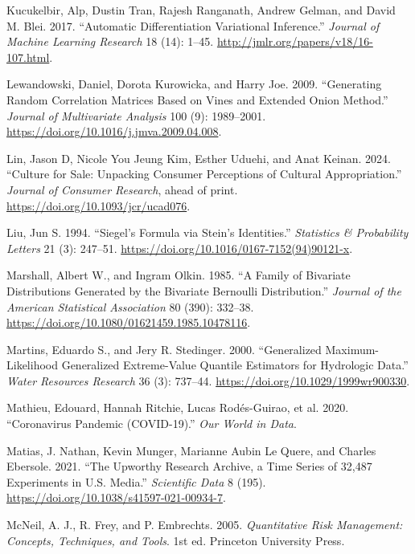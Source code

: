 \documentclass[
  11pt,
  letterpaper,
]{scrbook}
\newlength{\cslhangindent}
\newenvironment{CSLReferences}[2] %
 {\begin{list}{}{%
  \setlength{\itemindent}{0pt}
  \setlength{\leftmargin}{0pt}
  \setlength{\parsep}{0pt}
  \ifodd #1
   \setlength{\leftmargin}{\cslhangindent}
   \setlength{\itemindent}{-1\cslhangindent}
  \fi
  \setlength{\itemsep}{#2\baselineskip}}}
 {\end{list}}
\theoremstyle{definition}
\theoremstyle{plain}
\theoremstyle{plain}
\theoremstyle{plain}
\theoremstyle{definition}
\theoremstyle{definition}
\theoremstyle{plain}
\theoremstyle{plain}
\theoremstyle{remark}
\begin{document}
\begin{CSLReferences}{1}{1}
Kucukelbir, Alp, Dustin Tran, Rajesh Ranganath, Andrew Gelman, and David
M. Blei. 2017. {``Automatic Differentiation Variational Inference.''}
\emph{Journal of Machine Learning Research} 18 (14): 1--45.
\url{http://jmlr.org/papers/v18/16-107.html}.

Lewandowski, Daniel, Dorota Kurowicka, and Harry Joe. 2009.
{``Generating Random Correlation Matrices Based on Vines and Extended
Onion Method.''} \emph{Journal of Multivariate Analysis} 100 (9):
1989--2001. \url{https://doi.org/10.1016/j.jmva.2009.04.008}.

Lin, Jason D, Nicole You Jeung Kim, Esther Uduehi, and Anat Keinan.
2024. {``Culture for Sale: Unpacking Consumer Perceptions of Cultural
Appropriation.''} \emph{Journal of Consumer Research}, ahead of print.
\url{https://doi.org/10.1093/jcr/ucad076}.

Liu, Jun S. 1994. {``{S}iegel's Formula via {S}tein's Identities.''}
\emph{Statistics \& Probability Letters} 21 (3): 247--51.
\url{https://doi.org/10.1016/0167-7152(94)90121-x}.

Marshall, Albert W., and Ingram Olkin. 1985. {``A Family of Bivariate
Distributions Generated by the Bivariate {B}ernoulli Distribution.''}
\emph{Journal of the American Statistical Association} 80 (390):
332--38. \url{https://doi.org/10.1080/01621459.1985.10478116}.

Martins, Eduardo S., and Jery R. Stedinger. 2000. {``Generalized
Maximum-Likelihood Generalized Extreme-Value Quantile Estimators for
Hydrologic Data.''} \emph{Water Resources Research} 36 (3): 737--44.
\url{https://doi.org/10.1029/1999wr900330}.

Mathieu, Edouard, Hannah Ritchie, Lucas Rodés-Guirao, et al. 2020.
{``Coronavirus Pandemic (COVID-19).''} \emph{Our World in Data}.

Matias, J. Nathan, Kevin Munger, Marianne Aubin Le Quere, and Charles
Ebersole. 2021. {``The {U}pworthy {R}esearch {A}rchive, a Time Series of
32,487 Experiments in {U.S.} Media.''} \emph{Scientific Data} 8 (195).
\url{https://doi.org/10.1038/s41597-021-00934-7}.

McNeil, A. J., R. Frey, and P. Embrechts. 2005. \emph{Quantitative Risk
Management: Concepts, Techniques, and Tools}. 1st ed. Princeton
University Press.


\end{CSLReferences}
\end{document}
